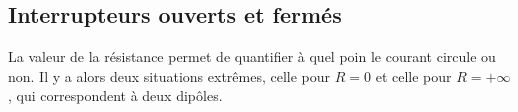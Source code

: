 \documentclass[../../main/main.tex]{subfiles}
\begin{document}
\vspace{-15pt}
\subsection{Interrupteurs ouverts et fermés}
La valeur de la résistance permet de quantifier à quel poin le courant
circule ou non. Il y a alors deux situations extrêmes, celle pour $R = 0$ et
celle pour $R = +\infty$, qui correspondent à deux dipôles.

\end{document}
